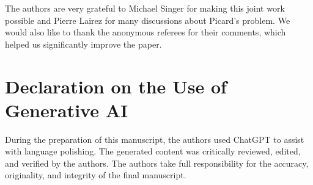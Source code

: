 \documentclass{amsart}
\theoremstyle{definition}
\numberwithin{equation}{section}
\numberwithin{thm}{section}
\begin{document}
The authors are very grateful to Michael Singer for making this joint work possible and Pierre Lairez for many discussions about Picard's problem. 
We would also like to thank the anonymous referees for their comments, which helped us significantly improve the paper.


\section*{Declaration on the Use of Generative AI}

During the preparation of this manuscript, the authors used ChatGPT to assist with language polishing. The generated content was critically reviewed, edited, and verified by the authors. The authors take full responsibility for the accuracy, originality, and integrity of the final manuscript.




\end{document}
